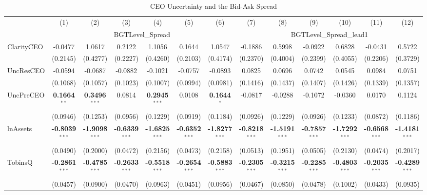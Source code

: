 \documentclass[11pt,a4paper]{article}
\begin{document}
\begin{table}[htbp]
\centering
\caption{CEO Uncertainty and the Bid-Ask Spread}
\label{tab:h14c_ceo2_decomp}
\scriptsize
\begin{tabular}{lcccccccccccc}
\toprule
 & (1) & (2) & (3) & (4) & (5) & (6) & (7) & (8) & (9) & (10) & (11) & (12) \\
 & \multicolumn{6}{c}{BGTLevel\_Spread} & \multicolumn{6}{c}{BGTLevel\_Spread\_lead1} \\
\cmidrule(lr){2-7} \cmidrule(lr){8-13}
\midrule
ClarityCEO & -0.0477 & 1.0617 & 0.2122 & 1.1056 & 0.1644 & 1.0547 & -0.1886 & 0.5998 & -0.0922 & 0.6828 & -0.0431 & 0.5722 \\
 & (0.2145) & (0.4277) & (0.2227) & (0.4260) & (0.2103) & (0.4174) & (0.2370) & (0.4004) & (0.2399) & (0.4055) & (0.2206) & (0.3729) \\
UncResCEO & -0.0594 & -0.0687 & -0.0882 & -0.1021 & -0.0757 & -0.0893 & 0.0825 & 0.0696 & 0.0742 & 0.0545 & 0.0984 & 0.0751 \\
 & (0.1068) & (0.1057) & (0.1023) & (0.1007) & (0.0994) & (0.0981) & (0.1416) & (0.1437) & (0.1407) & (0.1426) & (0.1339) & (0.1357) \\
UncPreCEO & \textbf{0.1664}$^{**}$ & \textbf{0.3496}$^{***}$ & 0.0814 & \textbf{0.2945}$^{***}$ & 0.0108 & \textbf{0.1644}$^{*}$ & -0.0817 & -0.0288 & -0.1072 & -0.0360 & 0.0170 & 0.1124 \\
 & (0.0946) & (0.1253) & (0.0956) & (0.1229) & (0.0919) & (0.1184) & (0.0926) & (0.1229) & (0.0926) & (0.1233) & (0.0872) & (0.1186) \\
\midrule
lnAssets & \textbf{-0.8039}$^{***}$ & \textbf{-1.9098}$^{***}$ & \textbf{-0.6339}$^{***}$ & \textbf{-1.6825}$^{***}$ & \textbf{-0.6352}$^{***}$ & \textbf{-1.8277}$^{***}$ & \textbf{-0.8218}$^{***}$ & \textbf{-1.5191}$^{***}$ & \textbf{-0.7857}$^{***}$ & \textbf{-1.7292}$^{***}$ & \textbf{-0.6568}$^{***}$ & \textbf{-1.4181}$^{***}$ \\
 & (0.0490) & (0.2000) & (0.0472) & (0.2156) & (0.0473) & (0.2158) & (0.0513) & (0.1951) & (0.0505) & (0.2130) & (0.0474) & (0.2017) \\
TobinsQ & \textbf{-0.2861}$^{***}$ & \textbf{-0.4785}$^{***}$ & \textbf{-0.2633}$^{***}$ & \textbf{-0.5518}$^{***}$ & \textbf{-0.2654}$^{***}$ & \textbf{-0.5883}$^{***}$ & \textbf{-0.2305}$^{***}$ & \textbf{-0.3215}$^{***}$ & \textbf{-0.2285}$^{***}$ & \textbf{-0.4803}$^{***}$ & \textbf{-0.2035}$^{***}$ & \textbf{-0.4289}$^{***}$ \\
 & (0.0457) & (0.0900) & (0.0470) & (0.0963) & (0.0451) & (0.0956) & (0.0467) & (0.0850) & (0.0478) & (0.1002) & (0.0433) & (0.0935) \\

\end{tabular}
\end{table}
\end{document}
